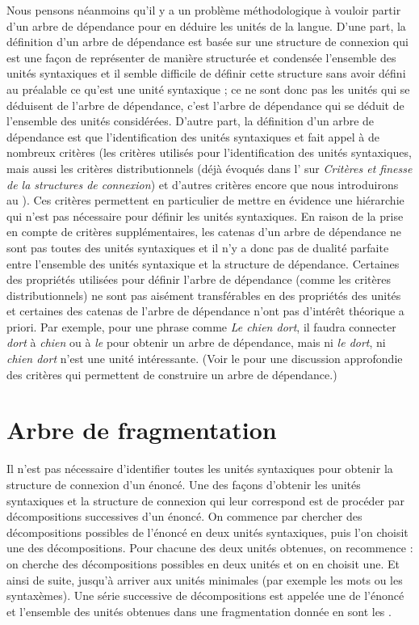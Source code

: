 {    Nous pensons néanmoins qu’il y a un problème méthodologique à vouloir partir d’un arbre de dépendance pour en déduire les unités de la langue. D’une part, la définition d’un arbre de dépendance est basée sur une structure de connexion qui est une façon de représenter de manière structurée et condensée l’ensemble des unités syntaxiques et il semble difficile de définir cette structure sans avoir défini au préalable ce qu’est une unité syntaxique ; ce ne sont donc pas les unités qui se déduisent de l’arbre de dépendance, c’est l’arbre de dépendance qui se déduit de l’ensemble des unités considérées. D’autre part, la définition d’un arbre de dépendance est  que l’identification des unités syntaxiques et fait appel à de nombreux critères (les critères utilisés pour l’identification des unités syntaxiques, mais aussi les critères distributionnels (déjà évoqués dans l' sur \textit{Critères et finesse de la structures de connexion}) et d’autres critères encore que nous introduirons au ). Ces critères permettent en particulier de mettre en évidence une hiérarchie qui n’est pas nécessaire pour définir les unités syntaxiques. En raison de la prise en compte de critères supplémentaires, les catenas d'un arbre de dépendance ne sont pas toutes des unités syntaxiques et il n’y a donc pas de dualité parfaite entre l’ensemble des unités syntaxique et la structure de dépendance. Certaines des propriétés utilisées pour définir l’arbre de dépendance (comme les critères distributionnels) ne sont pas aisément transférables en des propriétés des unités et certaines des catenas de l’arbre de dépendance n’ont pas d’intérêt théorique a priori. Par exemple, pour une phrase comme \textit{Le chien dort}, il faudra connecter \textit{dort} à \textit{chien} ou à \textit{le} pour obtenir un arbre de dépendance, mais ni \textit{le dort}, ni \textit{chien dort} n’est une unité intéressante. (Voir le  pour une discussion approfondie des critères qui permettent de construire un arbre de dépendance.)
}
\section{Arbre de fragmentation}\label{sec:3.2.21}

Il n’est pas nécessaire d’identifier toutes les unités syntaxiques pour obtenir la structure de connexion d'un énoncé. Une des façons d’obtenir les unités syntaxiques et la structure de connexion qui leur correspond est de procéder par décompositions successives d’un énoncé. On commence par chercher des décompositions possibles de l’énoncé en deux unités syntaxiques, puis l’on choisit une des décompositions. Pour chacune des deux unités obtenues, on recommence : on cherche des décompositions possibles en deux unités et on en choisit une. Et ainsi de suite, jusqu’à arriver aux unités minimales (par exemple les mots ou les syntaxèmes). Une série successive de décompositions est appelée une  de l’énoncé et l’ensemble des unités obtenues dans une fragmentation donnée en sont les .

